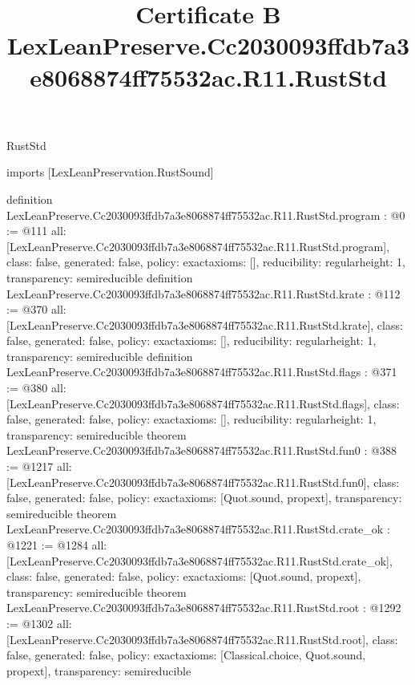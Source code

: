 \begin{lexlean}{RustStd}
\title{Certificate B LexLeanPreserve.Cc2030093ffdb7a3e8068874ff75532ac.R11.RustStd}
\begin{coremodule}
imports [LexLeanPreservation.RustSound]

definition LexLeanPreserve.Cc2030093ffdb7a3e8068874ff75532ac.R11.RustStd.program : @0 := @111 {
  all: [LexLeanPreserve.Cc2030093ffdb7a3e8068874ff75532ac.R11.RustStd.program],
  class: false,
  generated: false,
  policy: exact{axioms: []},
  reducibility: regular{height: 1},
  transparency: semireducible
}
definition LexLeanPreserve.Cc2030093ffdb7a3e8068874ff75532ac.R11.RustStd.krate : @112 := @370 {
  all: [LexLeanPreserve.Cc2030093ffdb7a3e8068874ff75532ac.R11.RustStd.krate],
  class: false,
  generated: false,
  policy: exact{axioms: []},
  reducibility: regular{height: 1},
  transparency: semireducible
}
definition LexLeanPreserve.Cc2030093ffdb7a3e8068874ff75532ac.R11.RustStd.flags : @371 := @380 {
  all: [LexLeanPreserve.Cc2030093ffdb7a3e8068874ff75532ac.R11.RustStd.flags],
  class: false,
  generated: false,
  policy: exact{axioms: []},
  reducibility: regular{height: 1},
  transparency: semireducible
}
theorem LexLeanPreserve.Cc2030093ffdb7a3e8068874ff75532ac.R11.RustStd.fun0 : @388 := @1217 {
  all: [LexLeanPreserve.Cc2030093ffdb7a3e8068874ff75532ac.R11.RustStd.fun0],
  class: false,
  generated: false,
  policy: exact{axioms: [Quot.sound, propext]},
  transparency: semireducible
}
theorem LexLeanPreserve.Cc2030093ffdb7a3e8068874ff75532ac.R11.RustStd.crate_ok : @1221 := @1284 {
  all: [LexLeanPreserve.Cc2030093ffdb7a3e8068874ff75532ac.R11.RustStd.crate_ok],
  class: false,
  generated: false,
  policy: exact{axioms: [Quot.sound, propext]},
  transparency: semireducible
}
theorem LexLeanPreserve.Cc2030093ffdb7a3e8068874ff75532ac.R11.RustStd.root : @1292 := @1302 {
  all: [LexLeanPreserve.Cc2030093ffdb7a3e8068874ff75532ac.R11.RustStd.root],
  class: false,
  generated: false,
  policy: exact{axioms: [Classical.choice, Quot.sound, propext]},
  transparency: semireducible
}


\end{coremodule}
\end{lexlean}
